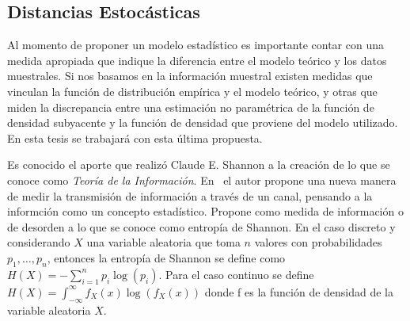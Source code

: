 %




\subsection{Distancias Estocásticas}

Al momento de proponer un modelo estadístico es importante contar con una medida apropiada que indique la diferencia entre el modelo teórico y los datos muestrales. Si nos basamos en la información muestral existen medidas que vinculan la función de distribución empírica y el modelo teórico, y otras que miden la discrepancia entre una estimación no paramétrica de la función de densidad subyacente y la función de densidad que proviene del modelo utilizado. En esta tesis se trabajará con esta última propuesta.

Es conocido el aporte que realizó Claude E. Shannon a la creaci\'on de lo que se conoce como \textit{Teoría de la Información}. En~\citet{Shannon1948} el autor propone una nueva manera de medir la transmisi\'on de informaci\'on a trav\'es de un canal, pensando a la informci\'on como un concepto estad\'istico. Propone como medida de informaci\'on o de desorden a lo que se conoce como entrop\'ia de Shannon. En el caso discreto y considerando $X$ una variable aleatoria que toma $n$ valores con probabilidades $p_1,\ldots,p_n$, entonces la entrop\'ia de Shannon se define como $H(X)=-\sum_{i=1}^n p_i \log(p_i)$. Para el caso continuo se define $H(X)=\int_{-\infty}^{\infty} f_X(x) \log(f_X(x))$ donde f es la función de densidad de la variable aleatoria $X$.

